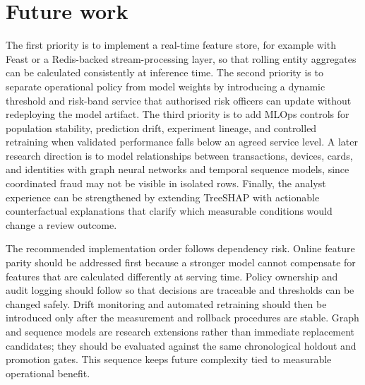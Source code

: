\section{Future work}

The first priority is to implement a real-time feature store, for example with Feast or a Redis-backed stream-processing layer, so that rolling entity aggregates can be calculated consistently at inference time. The second priority is to separate operational policy from model weights by introducing a dynamic threshold and risk-band service that authorised risk officers can update without redeploying the model artifact. The third priority is to add MLOps controls for population stability, prediction drift, experiment lineage, and controlled retraining when validated performance falls below an agreed service level. A later research direction is to model relationships between transactions, devices, cards, and identities with graph neural networks and temporal sequence models, since coordinated fraud may not be visible in isolated rows. Finally, the analyst experience can be strengthened by extending TreeSHAP with actionable counterfactual explanations that clarify which measurable conditions would change a review outcome.

The recommended implementation order follows dependency risk. Online feature
parity should be addressed first because a stronger model cannot compensate for
features that are calculated differently at serving time. Policy ownership and
audit logging should follow so that decisions are traceable and thresholds can
be changed safely. Drift monitoring and automated retraining should then be
introduced only after the measurement and rollback procedures are stable.
Graph and sequence models are research extensions rather than immediate
replacement candidates; they should be evaluated against the same chronological
holdout and promotion gates. This sequence keeps future complexity tied to
measurable operational benefit.
